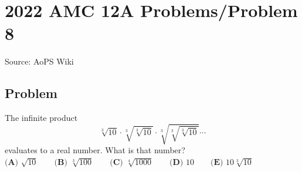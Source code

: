 \documentclass[12pt]{article}
\begin{document}
\section*{{2022 AMC 12A Problems/Problem 8}}
Source: AoPS Wiki

\subsection*{Problem}
The infinite product \[\sqrt[3]{10} \cdot \sqrt[3]{\sqrt[3]{10}} \cdot \sqrt[3]{\sqrt[3]{\sqrt[3]{10}}} \cdots\] evaluates to a real number. What is that number? $\textbf{(A) }\sqrt{10}\qquad\textbf{(B) }\sqrt[3]{100}\qquad\textbf{(C) }\sqrt[4]{1000}\qquad\textbf{(D) }10\qquad\textbf{(E) }10\sqrt[3]{10}$
\end{document}
